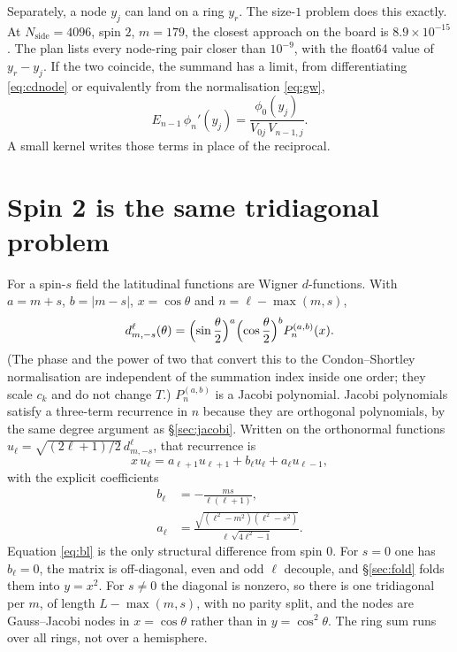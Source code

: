 \documentclass[11pt,a4paper]{article}
\numberwithin{equation}{section}
\begin{document}
Separately, a node $y_j$ can land on a ring $y_r$. The size-$1$ problem does this exactly.
At $N_{\mathrm{side}}=4096$, spin $2$, $m=179$, the closest approach on the board is
$8.9\times 10^{-15}$. The plan lists every node-ring pair closer than $10^{-9}$, with the
float64 value of $y_r-y_j$. If the two coincide, the summand has a limit, from
differentiating \eqref{eq:cdnode} or equivalently from the normalisation \eqref{eq:gw},
\[
  E_{n-1}\,\phi_n'(y_j)
  = \frac{\phi_0(y_j)}{V_{0j}\, V_{n-1,j}}.
\]
A small kernel writes those terms in place of the reciprocal.

\section{Spin 2 is the same tridiagonal problem}
\label{sec:spin2}

For a spin-$s$ field the latitudinal functions are Wigner $d$-functions. With
$a=m+s$, $b=|m-s|$, $x=\cos\theta$ and $n=\ell-\max(m,s)$,
\begin{equation}
  d^\ell_{m,-s}(\theta)
  = \Bigl(\sin\frac{\theta}{2}\Bigr)^{a}
    \Bigl(\cos\frac{\theta}{2}\Bigr)^{b}
    P_n^{(a,b)}(x).
  \label{eq:djac}
\end{equation}
(The phase and the power of two that convert this to the Condon--Shortley normalisation
are independent of the summation index inside one order; they scale $c_k$ and do not
change $T$.) $P_n^{(a,b)}$ is a Jacobi polynomial. Jacobi polynomials satisfy a
three-term recurrence in $n$ because they are orthogonal polynomials, by the same degree
argument as \S\ref{sec:jacobi}. Written on the orthonormal functions
$u_\ell=\sqrt{(2\ell+1)/2}\, d^\ell_{m,-s}$, that recurrence is
\begin{equation}
  x\, u_\ell = a_{\ell+1} u_{\ell+1} + b_\ell u_\ell + a_\ell u_{\ell-1},
  \label{eq:wrec}
\end{equation}
with the explicit coefficients
\begin{align}
  b_\ell &= -\frac{ms}{\ell(\ell+1)},
  \label{eq:bl}\\
  a_\ell &= \frac{\sqrt{(\ell^2-m^2)(\ell^2-s^2)}}{\ell\,\sqrt{4\ell^2-1}}.
  \label{eq:al}
\end{align}
Equation \eqref{eq:bl} is the only structural difference from spin $0$. For $s=0$ one has
$b_\ell=0$, the matrix is off-diagonal, even and odd $\ell$ decouple, and \S\ref{sec:fold}
folds them into $y=x^2$. For $s\neq 0$ the diagonal is nonzero, so there is one tridiagonal
per $m$, of length $L-\max(m,s)$, with no parity split, and the nodes are Gauss--Jacobi
nodes in $x=\cos\theta$ rather than in $y=\cos^2\theta$. The ring sum runs over all rings,
not over a hemisphere.
\end{document}
